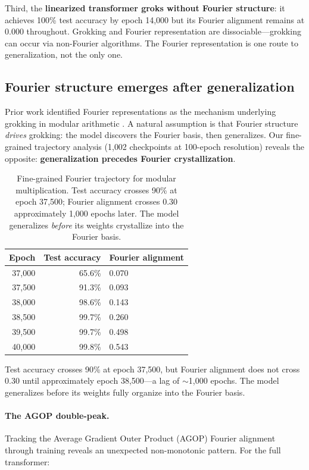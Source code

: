 \documentclass{article}
\begin{document}
Third, the \textbf{linearized transformer groks without Fourier structure}:
it achieves 100\% test accuracy by epoch 14{,}000 but its Fourier alignment
remains at 0.000 throughout. Grokking and Fourier representation are
dissociable---grokking can occur via non-Fourier algorithms. The Fourier
representation is one route to generalization, not the only one.

\subsection{Fourier structure emerges after generalization}
\label{sec:fourier_trajectory}

Prior work identified Fourier representations as the mechanism underlying
grokking in modular arithmetic \citep{nanda2023progress, zhong2024clock}.
A natural assumption is that Fourier structure \emph{drives} grokking:
the model discovers the Fourier basis, then generalizes. Our fine-grained
trajectory analysis (1{,}002 checkpoints at 100-epoch resolution) reveals
the opposite: \textbf{generalization precedes Fourier crystallization}.

\begin{table}[t]
\centering
\small
\begin{tabular}{rrl}
\toprule
Epoch & Test accuracy & Fourier alignment \\
\midrule
37{,}000 & 65.6\% & 0.070 \\
37{,}500 & 91.3\% & 0.093 \\
38{,}000 & 98.6\% & 0.143 \\
38{,}500 & 99.7\% & 0.260 \\
39{,}500 & 99.7\% & 0.498 \\
40{,}000 & 99.8\% & 0.543 \\
\bottomrule
\end{tabular}
\caption{Fine-grained Fourier trajectory for modular multiplication.
Test accuracy crosses 90\% at epoch 37{,}500; Fourier alignment crosses 0.30
approximately 1{,}000 epochs later. The model generalizes \emph{before} its
weights crystallize into the Fourier basis.}
\label{tab:fourier_lag}
\end{table}

Test accuracy crosses 90\% at epoch 37{,}500, but Fourier alignment does not
cross 0.30 until approximately epoch 38{,}500---a lag of $\sim$1{,}000
epochs. The model generalizes before its weights fully organize into the
Fourier basis.

\paragraph{The AGOP double-peak.}
Tracking the Average Gradient Outer Product (AGOP) Fourier alignment through
training reveals an unexpected non-monotonic pattern. For the full transformer:
\end{document}
